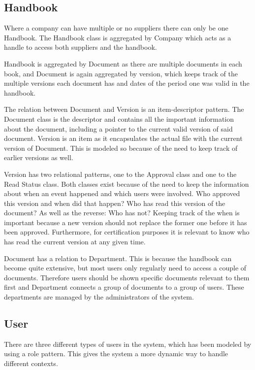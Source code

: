 \subsection{Handbook}
Where a company can have multiple or no suppliers there can only be one Handbook.
The Handbook class is aggregated by Company which acts as a handle to access both suppliers and the handbook.

Handbook is aggregated by Document as there are multiple documents in each book, and Document is again aggregated by version, which keeps track of the multiple versions each document has and dates of the period one was valid in the handbook.

The relation between Document and Version is an item-descriptor pattern.
The Document class is the descriptor and contains all the important information about the document, including a pointer to the current valid version of said document.
Version is an item as it encapsulates the actual file with the current version of Document.
This is modeled so because of the need to keep track of earlier versions as well.

Version has two relational patterns, one to the Approval class and one to the Read Status class.
Both classes exist because of the need to keep the information about when an event happened and which users were involved.
Who approved this version and when did that happen?
Who has read this version of the document?
As well as the reverse: Who has not?
Keeping track of the when is important because a new version should not replace the former one before it has been approved.
Furthermore, for certification purposes it is relevant to know who has read the current version at any given time.

Document has a relation to Department.
This is because the handbook can become quite extensive, but most users only regularly need to access a couple of documents.
Therefore users should be shown specific documents relevant to them first and Department connects a group of documents to a group of users.
These departments are managed by the administrators of the system.

\subsection{User}
There are three different types of users in the system, which has been modeled by using a role pattern. This gives the system a more dynamic way to handle different contexts.

